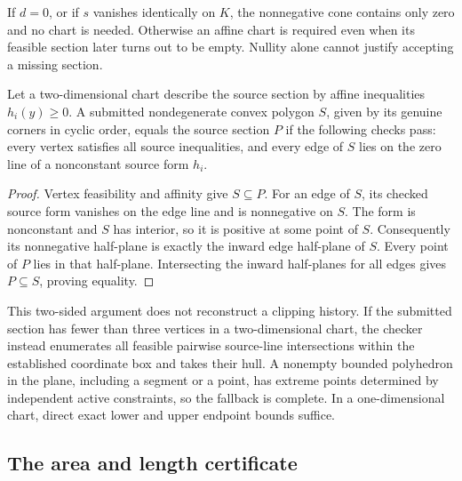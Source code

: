 If \(d=0\), or if \(s\) vanishes identically on \(K\), the
nonnegative cone contains only zero and no chart is needed.
Otherwise an affine chart is required even when its feasible
section later turns out to be empty.  Nullity alone cannot
justify accepting a missing section.

\begin{proposition}
\label{cv:section-facets}
Let a two-dimensional chart describe the source section by
affine inequalities \(h_i(y)\geq0\).
A submitted nondegenerate convex polygon \(S\), given by its
genuine corners in cyclic order, equals the source section \(P\)
if the following checks pass:
every vertex satisfies all source inequalities, and every edge
of \(S\) lies on the zero line of a nonconstant source form \(h_i\).
\end{proposition}
\begin{proof}
Vertex feasibility and affinity give \(S\subseteq P\).
For an edge of \(S\), its checked source form vanishes on the
edge line and is nonnegative on \(S\).
The form is nonconstant and \(S\) has interior, so it is positive
at some point of \(S\).  Consequently its nonnegative half-plane
is exactly the inward edge half-plane of \(S\).
Every point of \(P\) lies in that half-plane.
Intersecting the inward half-planes for all edges gives
\(P\subseteq S\), proving equality.
\end{proof}

This two-sided argument does not reconstruct a clipping history.
If the submitted section has fewer than three vertices in a
two-dimensional chart, the checker instead enumerates all feasible
pairwise source-line intersections within the established coordinate
box and takes their hull.  A nonempty bounded polyhedron in the plane,
including a segment or a point, has extreme points determined by
independent active constraints, so the fallback is complete.
In a one-dimensional chart, direct exact lower and upper endpoint
bounds suffice.

\subsection{The area and length certificate}
\label{cv:measure}

